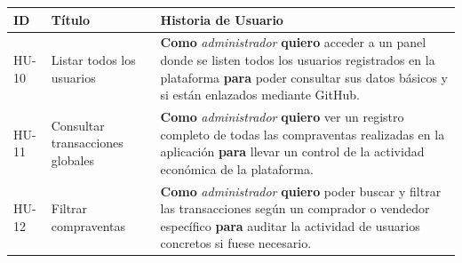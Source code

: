 \documentclass[11pt]{article}
\begin{document}
          \begin{table}[H]
              \centering
              \begin{tabularx}{\textwidth}{|l|p{3.5cm}|X|}
                  \hline
                  \textbf{ID} & \textbf{Título}                  & \textbf{Historia de Usuario}                                                                                                                                                                                                  \\ \hline
                  HU-10       & Listar todos los usuarios        & \textbf{Como} \textit{administrador} \textbf{quiero} acceder a un panel donde se listen todos los usuarios registrados en la plataforma \textbf{para} poder consultar sus datos básicos y si están enlazados mediante GitHub. \\ \hline
                  HU-11       & Consultar transacciones globales & \textbf{Como} \textit{administrador} \textbf{quiero} ver un registro completo de todas las compraventas realizadas en la aplicación \textbf{para} llevar un control de la actividad económica de la plataforma.               \\ \hline
                  HU-12       & Filtrar compraventas             & \textbf{Como} \textit{administrador} \textbf{quiero} poder buscar y filtrar las transacciones según un comprador o vendedor específico \textbf{para} auditar la actividad de usuarios concretos si fuese necesario.           \\ \hline
              \end{tabularx}
          \end{table}
\end{document}
